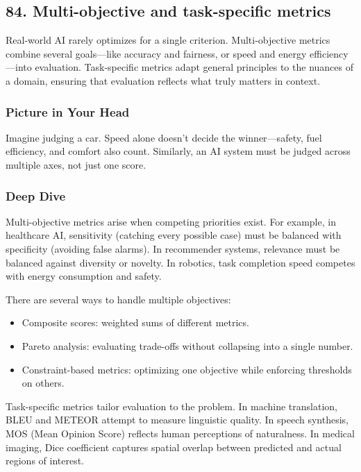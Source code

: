 \documentclass[
  letterpaper,
  DIV=11,
  numbers=noendperiod]{scrreprt}
\providecommand{\tightlist}{%
  \setlength{\itemsep}{0pt}\setlength{\parskip}{0pt}}
\begin{document}
\subsection{84. Multi-objective and task-specific
metrics}\label{multi-objective-and-task-specific-metrics}

Real-world AI rarely optimizes for a single criterion. Multi-objective
metrics combine several goals---like accuracy and fairness, or speed and
energy efficiency---into evaluation. Task-specific metrics adapt general
principles to the nuances of a domain, ensuring that evaluation reflects
what truly matters in context.

\subsubsection{Picture in Your Head}\label{picture-in-your-head-83}

Imagine judging a car. Speed alone doesn't decide the winner---safety,
fuel efficiency, and comfort also count. Similarly, an AI system must be
judged across multiple axes, not just one score.

\subsubsection{Deep Dive}\label{deep-dive-83}

Multi-objective metrics arise when competing priorities exist. For
example, in healthcare AI, sensitivity (catching every possible case)
must be balanced with specificity (avoiding false alarms). In
recommender systems, relevance must be balanced against diversity or
novelty. In robotics, task completion speed competes with energy
consumption and safety.

There are several ways to handle multiple objectives:

\begin{itemize}
\tightlist
\item
  Composite scores: weighted sums of different metrics.
\item
  Pareto analysis: evaluating trade-offs without collapsing into a
  single number.
\item
  Constraint-based metrics: optimizing one objective while enforcing
  thresholds on others.
\end{itemize}

Task-specific metrics tailor evaluation to the problem. In machine
translation, BLEU and METEOR attempt to measure linguistic quality. In
speech synthesis, MOS (Mean Opinion Score) reflects human perceptions of
naturalness. In medical imaging, Dice coefficient captures spatial
overlap between predicted and actual regions of interest.
\end{document}

